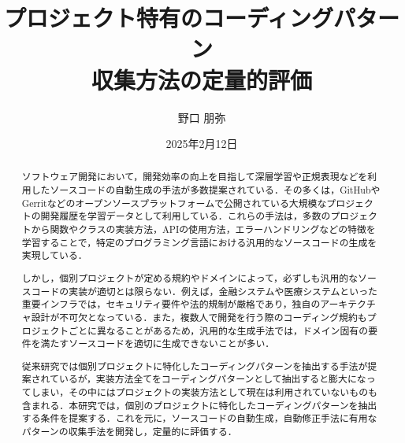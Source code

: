 \documentclass[11pt]{jreport}
\title{プロジェクト特有のコーディングパターン\\収集方法の定量的評価}
\author{野口 朋弥}
\date{2025年2月12日}	%
\begin{document}
\maketitle

\begin{abstract}
ソフトウェア開発において，開発効率の向上を目指して深層学習や正規表現などを利用したソースコードの自動生成の手法が多数提案されている．その多くは，GitHubやGerritなどのオープンソースプラットフォームで公開されている大規模なプロジェクトの開発履歴を学習データとして利用している．これらの手法は，多数のプロジェクトから関数やクラスの実装方法，APIの使用方法，エラーハンドリングなどの特徴を学習することで，特定のプログラミング言語における汎用的なソースコードの生成を実現している．

しかし，個別プロジェクトが定める規約やドメインによって，必ずしも汎用的なソースコードの実装が適切とは限らない．例えば，金融システムや医療システムといった重要インフラでは，セキュリティ要件や法的規制が厳格であり，独自のアーキテクチャ設計が不可欠となっている．また，複数人で開発を行う際のコーディング規約もプロジェクトごとに異なることがあるため，汎用的な生成手法では，ドメイン固有の要件を満たすソースコードを適切に生成できないことが多い．

従来研究では個別プロジェクトに特化したコーディングパターンを抽出する手法が提案されているが，実装方法全てをコーディングパターンとして抽出すると膨大になってしまい，その中にはプロジェクトの実装方法として現在は利用されていないものも含まれる．本研究では，個別のプロジェクトに特化したコーディングパターンを抽出する条件を提案する．これを元に，ソースコードの自動生成，自動修正手法に有用なパターンの収集手法を開発し，定量的に評価する．
\end{abstract}

\tableofcontents



\newpage
{}	%


\end{document}
